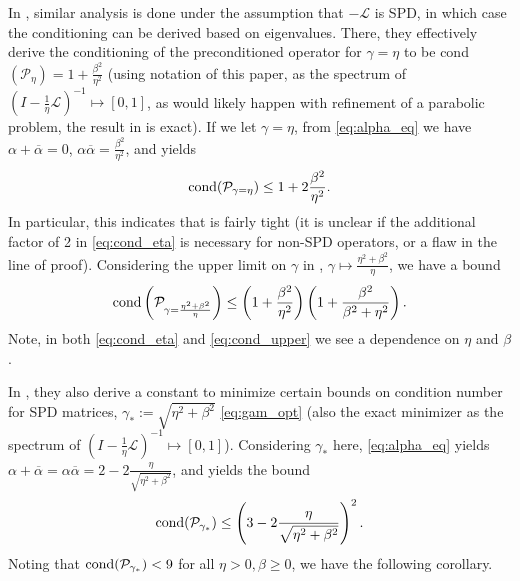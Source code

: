 \documentclass[review]{siamart}
\begin{document}
In \cite{exh}, similar analysis is done under the assumption
that $-\mathcal{L}$ is SPD, in which case the conditioning can be derived based on
eigenvalues. There, they effectively derive the conditioning of the preconditioned
operator for $\gamma = \eta$ to be cond$(\mathcal{P}_\eta) = 1 + \tfrac{\beta^2}{\eta^2}$
(using notation of this paper, as the spectrum of $(I - \tfrac{1}{\eta}\mathcal{L})^{-1}
\mapsto [0,1]$, as would likely happen with refinement of a parabolic problem,
the result in \cite{exh} is exact).
If we let $\gamma = \eta$, from \eqref{eq:alpha_eq} we have
$\alpha+\overline{\alpha} = 0$, $\alpha\overline{\alpha} =
\frac{\beta^2}{\eta^2}$, and  yields
%
\begin{align}\label{eq:cond_eta}
\textnormal{cond}(\mathcal{P}_{\gamma = \eta}) \leq 1 + 2\frac{\beta^2}{\eta^2}.
\end{align}
%
In particular, this indicates that  is fairly tight (it is unclear
if the additional factor of 2 in \eqref{eq:cond_eta} is necessary for non-SPD
operators, or a flaw in the line of proof).
Considering the upper limit on $\gamma$ in , $\gamma \mapsto
\tfrac{\eta^2+\beta^2}{\eta}$, we have a bound
%
\begin{align}\label{eq:cond_upper}
\textnormal{cond}\left(\mathcal{P}_{\gamma = \frac{\eta^2+\beta^2}{\eta}}\right) \leq
	\left(1 + \frac{\beta^2}{\eta^2}\right) \left(1 + \frac{\beta^2}{\beta^2 + \eta^2}\right).
\end{align}
%
Note, in both \eqref{eq:cond_eta} and \eqref{eq:cond_upper} we see a dependence
on $\eta$ and $\beta$.

In \cite{exh}, they also derive a constant to minimize certain bounds on condition
number for SPD matrices, $\gamma _* := \sqrt{\eta^2+\beta^2}$ \eqref{eq:gam_opt}
(also the exact minimizer as the spectrum of $(I - \tfrac{1}{\eta}\mathcal{L})^{-1}
\mapsto [0,1]$). Considering $\gamma_*$ here, \eqref{eq:alpha_eq} yields
$\alpha+\overline{\alpha} = \alpha\overline{\alpha} =
2 - 2\frac{\eta}{\sqrt{\eta^2+\beta^2}}$, and  yields the bound
%
\begin{align}\label{eq:cond_opt}
\textnormal{cond}(\mathcal{P}_{\gamma_*})
	\leq \left(3 - 2\frac{\eta}{\sqrt{\eta^2+\beta^2}}\right)^2.
\end{align}
%
Noting that $\textnormal{cond}(\mathcal{P}_{\gamma_*}) < 9$ for all $\eta>0,
\beta\geq 0$, we have the following corollary.
\end{document}
